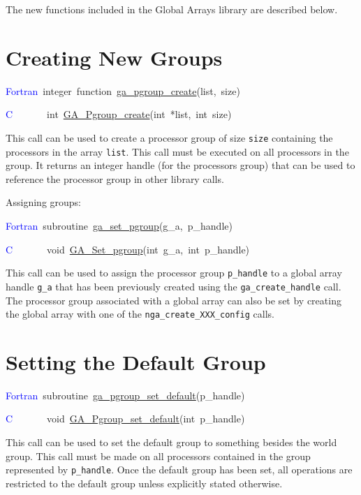 The new functions included in the Global Arrays library are described
below. 


\section{Creating New Groups}
\begin{lyxcode}
\textcolor{blue}{Fortran}~integer~function~\href{http://www.emsl.pnl.gov/docs/global/ga_ops.html\#GA_PGROUP_CREATE}{ga\_{}pgroup\_{}create}(list,~size)

\textcolor{blue}{C}~~~~~~~int~\href{http://www.emsl.pnl.gov/docs/global/c_nga_ops.html\#GA_PGROUP_CREATE}{GA\_{}Pgroup\_{}create}(int~{*}list,~int~size)
\end{lyxcode}
This call can be used to create a processor group of size \texttt{size}
containing the processors in the array \texttt{list}. This call must
be executed on all processors in the group. It returns an integer
handle (for the processors group) that can be used to reference the
processor group in other library calls.

Assigning groups:
\begin{lyxcode}
\textcolor{blue}{Fortran}~subroutine~\href{http://www.emsl.pnl.gov/docs/global/ga_ops.html\#GA_SET_PGROUP}{ga\_{}set\_{}pgroup}(g\_a,~p\_handle)

\textcolor{blue}{C}~~~~~~~void~\href{http://www.emsl.pnl.gov/docs/global/c_nga_ops.html\#GA_SET_PGROUP}{GA\_{}Set\_{}pgroup}(int~g\_a,~int~p\_handle)
\end{lyxcode}
This call can be used to assign the processor group \texttt{p\_handle}
to a global array handle \texttt{g\_a} that has been previously created
using the \texttt{ga\_create\_handle} call. The processor group associated
with a global array can also be set by creating the global array with
one of the \texttt{nga\_create\_XXX\_config} calls. 


\section{Setting the Default Group}
\begin{lyxcode}
\textcolor{blue}{Fortran}~subroutine~\href{http://www.emsl.pnl.gov/docs/global/ga_ops.html\#GA_PGROUP_SET_DEFAULT}{ga\_{}pgroup\_{}set\_{}default}(p\_handle)

\textcolor{blue}{C}~~~~~~~void~\href{http://www.emsl.pnl.gov/docs/global/c_nga_ops.html\#GA_PGROUP_SET_DEFAULT}{GA\_{}Pgroup\_{}set\_{}default}(int~p\_handle)
\end{lyxcode}
This call can be used to set the default group to something besides
the world group. This call must be made on all processors contained
in the group represented by \texttt{p\_handle}. Once the default group
has been set, all operations are restricted to the default group unless
explicitly stated otherwise. 


